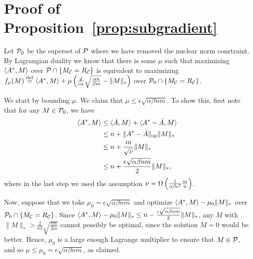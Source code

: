 \section{Proof of Proposition~\ref{prop:subgradient}}
Let $\mathcal{P}_0$ be the superset of $\mathcal{P}$ where we have removed the 
nuclear norm constraint. By Lagrangian duality we 
know that there is some $\mu$ such that maximizing 
$\langle A^*, M \rangle$ over $\mathcal{P} \cap \{M_{\mathcal{C}} = R_{\mathcal{C}}\}$ 
is equivalent to maximizing $f_\mu(M) \stackrel{\rm def}{=} \langle A^*, M \rangle + \mu\left( \frac{2}{\epsilon\alpha}\sqrt{\frac{\alpha n}{\beta m}} - \|M\|_* \right)$ over 
$\mathcal{P}_0 \cap \{M_{\mathcal{C}} = R_{\mathcal{C}}\}$. 

We start by bounding $\mu$. We claim that $\mu \leq \epsilon \sqrt{\alpha\beta nm}$. 
To show this, first note that for any $M \in \mathcal{P}_0$, we have 
\begin{align}
\langle A^*, M \rangle &\leq \langle \bar{A}, M \rangle + \langle A^* - \bar{A}, M \rangle \\
 &\leq n + \|A^* - \bar{A}\|_{\mathrm{op}}\|M\|_* \\
 &\leq n + \frac{m}{\sqrt{\nu}}\|M\|_* \\
 &\leq n + \frac{\epsilon\sqrt{\alpha\beta nm}}{2}\|M\|_*,
\end{align}
where in the last step we used the assumption $\nu = \Omega\left( \frac{1}{\alpha\beta\epsilon^2}\frac{m}{n} \right)$.

Now, suppose that we take $\mu_0 = \epsilon \sqrt{\alpha\beta nm}$ and optimize $\langle A^*, M \rangle - \mu_0\|M\|_*$ over 
$\mathcal{P}_0 \cap \{M_{\mathcal{C}} = R_{\mathcal{C}}\}$. Since $\langle A^*, M \rangle - \mu_0\|M\|_* \leq n - \frac{\epsilon \sqrt{\alpha\beta nm}}{2}\|M\|_*$, 
any $M$ with $\|M\|_* > \frac{2}{\epsilon\alpha}\sqrt{\frac{\alpha n}{\beta m}}$ cannot possibly be optimal, since the solution $M = 0$ would 
be better. Hence, $\mu_0$ is a large enough Lagrange multiplier to ensure that $M \in \mathcal{P}$, and so 
$\mu \leq \mu_0 = \epsilon \sqrt{\alpha\beta nm}$, as claimed.

